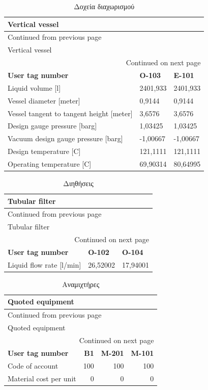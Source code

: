 \documentclass[11pt]{article}
\begin{document}
\begin{longtable}{lll}
\caption{Δοχεία διαχωρισμού}
\\
Vertical vessel &  & \\
\hline
\endfirsthead
\multicolumn{3}{l}{Continued from previous page} \\
\hline

Vertical vessel &  &  \\

\hline
\endhead
\hline\multicolumn{3}{r}{Continued on next page} \\
\endfoot
\endlastfoot
\hline
\textbf{User tag number} & \textbf{O-103} & \textbf{E-101}\\
Liquid volume [l] & 2401,933 & 2401,933\\
Vessel diameter [meter] & 0,9144 & 0,9144\\
Vessel tangent to tangent height [meter] & 3,6576 & 3,6576\\
Design gauge pressure [barg] & 1,03425 & 1,03425\\
Vacuum design gauge pressure [barg] & -1,00667 & -1,00667\\
Design temperature [C] & 121,1111 & 121,1111\\
Operating temperature [C] & 69,90314 & 80,64995\\
\end{longtable}

\begin{longtable}{lll}
\caption{Διηθήσεις}
\\
Tubular filter &  & \\
\hline
\endfirsthead
\multicolumn{3}{l}{Continued from previous page} \\
\hline

Tubular filter &  &  \\

\hline
\endhead
\hline\multicolumn{3}{r}{Continued on next page} \\
\endfoot
\endlastfoot
\hline
\textbf{User tag number} & \textbf{O-102} & \textbf{O-104}\\
Liquid flow rate [l/min] & 26,52002 & 17,94001\\
\end{longtable}

\begin{longtable}{lrrr}
\caption{Αναμιχτήρες}
\\
Quoted equipment &  &  & \\
\hline
\endfirsthead
\multicolumn{4}{l}{Continued from previous page} \\
\hline

Quoted equipment &  &  &  \\

\hline
\endhead
\hline\multicolumn{4}{r}{Continued on next page} \\
\endfoot
\endlastfoot
\hline
\textbf{User tag number} & \textbf{B1} & \textbf{M-201} & \textbf{M-101}\\
Code of account & 100 & 100 & 100\\
Material cost per unit & 0 & 0 & 0\\
\end{longtable}
\end{document}
